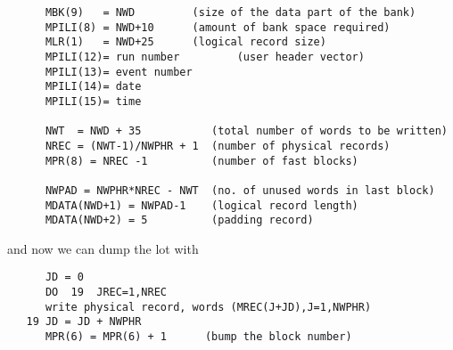\begin{verbatim}
      MBK(9)   = NWD         (size of the data part of the bank)
      MPILI(8) = NWD+10      (amount of bank space required)
      MLR(1)   = NWD+25      (logical record size)
      MPILI(12)= run number         (user header vector)
      MPILI(13)= event number
      MPILI(14)= date
      MPILI(15)= time

      NWT  = NWD + 35           (total number of words to be written)
      NREC = (NWT-1)/NWPHR + 1  (number of physical records)
      MPR(8) = NREC -1          (number of fast blocks)

      NWPAD = NWPHR*NREC - NWT  (no. of unused words in last block)
      MDATA(NWD+1) = NWPAD-1    (logical record length)
      MDATA(NWD+2) = 5          (padding record)
\end{verbatim}

and now we can dump the lot with

\begin{verbatim}
      JD = 0
      DO  19  JREC=1,NREC
      write physical record, words (MREC(J+JD),J=1,NWPHR)
   19 JD = JD + NWPHR
      MPR(6) = MPR(6) + 1      (bump the block number)
\end{verbatim}
